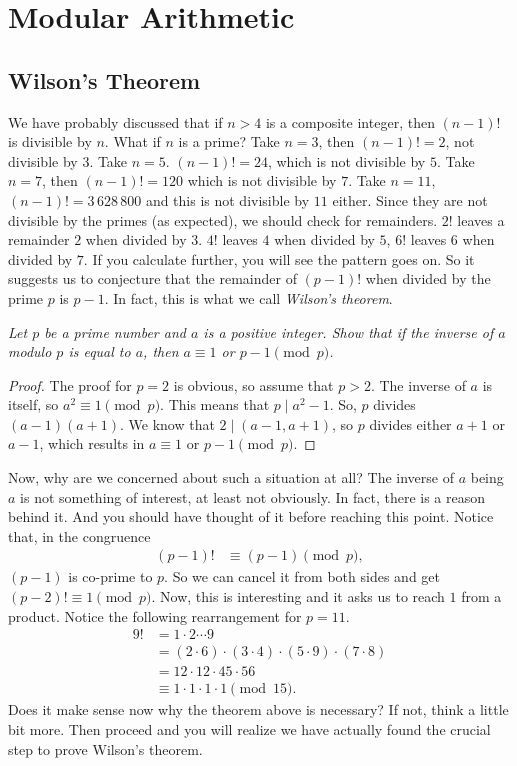 \documentclass{subfile}
\begin{document}
\chapter{Modular Arithmetic}\label{ch:congruence}

		
	    

	\section{Wilson's Theorem}
	We have probably discussed that if $n>4$ is a composite integer, then $(n-1)!$ is divisible by $n$. What if $n$ is a prime? Take $n=3$, then $(n-1)!=2$, not divisible by $3$. Take $n=5$. $(n-1)!=24$, which is not divisible by $5$. Take $n=7$, then $(n-1)!=120$ which is not divisible by $7$. Take $n=11$, $(n-1)!=3\, 628\, 800$ and this is not divisible by $11$ either. Since they are not divisible by the primes (as expected), we should check for remainders. $2!$ leaves a remainder $2$ when divided by $3$. $4!$ leaves $4$ when divided by $5$, $6!$ leaves $6$ when divided by $7$. If you calculate further, you will see the pattern goes on. So it suggests us to conjecture that the remainder of $(p-1)!$ when divided by the prime $p$ is $p-1$. In fact, this is what we call \textit{Wilson's theorem}.
		\begin{theorem} \label{thm:selfinverse} \slshape
			Let $p$ be a prime number and $a$ is a positive integer. Show that if the inverse of $a$ modulo $p$ is equal to $a$, then $a \equiv 1$ or $p-1 \pmod p$.
		\end{theorem}

		\begin{proof}
			The proof for $p=2$ is obvious, so assume that $p>2$. The inverse of $a$ is itself, so $a^2 \equiv 1 \pmod p$. This means that $p\mid a^2-1$. So, $p$ divides $(a-1)(a+1)$. We know that $2\mid (a-1, a+1)$, so $p$ divides either $a+1$ or $a-1$, which results in $a \equiv 1$ or $p-1 \pmod p$.
		\end{proof}
	Now, why are we concerned about such a situation at all? The inverse of $a$ being $a$ is not something of interest, at least not obviously. In fact, there is a reason behind it. And you should have thought of it before reaching this point. Notice that, in the congruence
		\begin{align*}
			(p-1)! & \equiv(p-1)\pmod p,
		\end{align*}
	$(p-1)$ is co-prime to $p$. So we can cancel it from both sides and get $(p-2)!\equiv1\pmod p$. Now, this is interesting and it asks us to reach $1$ from a product. Notice the following rearrangement for $p=11$.
		\begin{align*}
			9! & = 1\cdot2\cdots9\\
				&= \left(2\cdot6\right)\cdot\left(3\cdot4\right)\cdot\left(5\cdot9\right)\cdot\left(7\cdot8\right)\\
				& = 12\cdot12\cdot45\cdot56\\
				& \equiv1\cdot1\cdot1\cdot1\pmod{15}.
		\end{align*}
	Does it make sense now why the theorem above is necessary? If not, think a little bit more. Then proceed and you will realize we have actually found the crucial step to prove Wilson's theorem.
\end{document}
